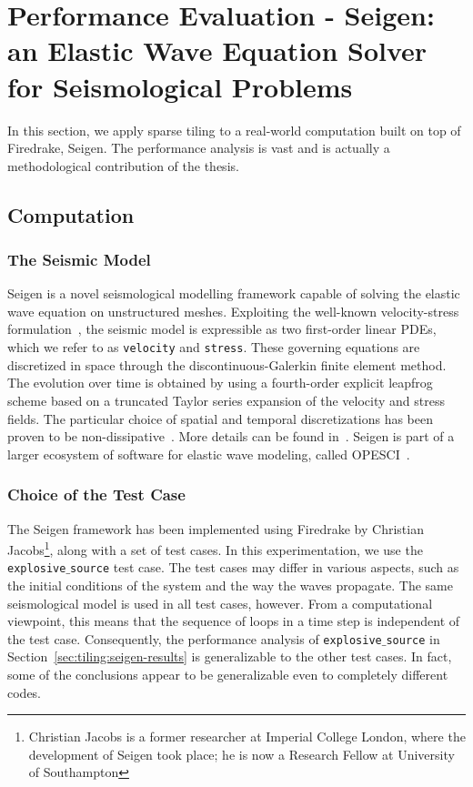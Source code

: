 \section{Performance Evaluation - Seigen: an Elastic Wave Equation Solver for Seismological Problems}
\label{sec:tiling:seigen}
In this section, we apply sparse tiling to a real-world computation built on top of Firedrake, Seigen. The performance analysis is vast and is actually a methodological contribution of the thesis.

\subsection{Computation}
\label{sec:tiling:seigen:comp}

\subsubsection{The Seismic Model}
Seigen is a novel seismological modelling framework capable of solving the elastic wave equation on unstructured meshes. Exploiting the well-known velocity-stress formulation~\citep{Seigen-3}, the seismic model is expressible as two first-order linear PDEs, which we refer to as {\tt velocity} and {\tt stress}. These governing equations are discretized in space through the discontinuous-Galerkin finite element method. The evolution over time is obtained by using a fourth-order explicit leapfrog scheme based on a truncated Taylor series expansion of the velocity and stress fields. The particular choice of spatial and temporal discretizations has been proven to be non-dissipative~\citep{Seigen-1}. More details can be found in~\cite{Seigen-paper}. Seigen is part of a larger ecosystem of software for elastic wave modeling, called OPESCI~\citep{opesci-project}. 

\subsubsection{Choice of the Test Case}
The Seigen framework has been implemented using Firedrake by Christian Jacobs\footnote{Christian Jacobs is a former researcher at Imperial College London, where the development of Seigen took place; he is now a Research Fellow at University of Southampton}, along with a set of test cases. In this experimentation, we use the {\tt explosive$\_$source} test case. The test cases may differ in various aspects, such as the initial conditions of the system and the way the waves propagate. The same seismological model is used in all test cases, however. From a computational viewpoint, this means that the sequence of loops in a time step is independent of the test case. Consequently, the performance analysis of {\tt explosive$\_$source} in Section~\ref{sec:tiling:seigen-results} is generalizable to the other test cases. In fact, some of the conclusions appear to be generalizable even to completely different codes. 

